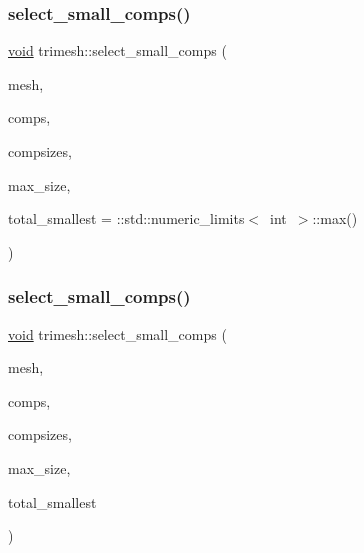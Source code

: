 \mbox{\label{namespacetrimesh_a2ce21b5b98ba2c6875d4c4506b344e91}} 
\subsubsection{\texorpdfstring{select\+\_\+small\+\_\+comps()}{select\_small\_comps()}\hspace{0.1cm}{\footnotesize\ttfamily [1/2]}}
{\footnotesize\ttfamily \hyperlink{namespacetrimesh_a784ddfd979e1c579bda795a8edfc3f43}{void} trimesh\+::select\+\_\+small\+\_\+comps (\begin{DoxyParamCaption}\item[{\hyperlink{classtrimesh_1_1TriMesh}{Tri\+Mesh} $\ast$}]{mesh,  }\item[{const \+::std\+::vector$<$ int $>$ \&}]{comps,  }\item[{const \+::std\+::vector$<$ int $>$ \&}]{compsizes,  }\item[{int}]{max\+\_\+size,  }\item[{int}]{total\+\_\+smallest = {\ttfamily \+:\+:std\+:\+:numeric\+\_\+limits$<$~int~$>$\+:\+:max()} }\end{DoxyParamCaption})}

\mbox{\label{namespacetrimesh_a62e760562ced336ba88b144230b7c14d}} 
\subsubsection{\texorpdfstring{select\+\_\+small\+\_\+comps()}{select\_small\_comps()}\hspace{0.1cm}{\footnotesize\ttfamily [2/2]}}
{\footnotesize\ttfamily \hyperlink{namespacetrimesh_a784ddfd979e1c579bda795a8edfc3f43}{void} trimesh\+::select\+\_\+small\+\_\+comps (\begin{DoxyParamCaption}\item[{\hyperlink{classtrimesh_1_1TriMesh}{Tri\+Mesh} $\ast$}]{mesh,  }\item[{const vector$<$ int $>$ \&}]{comps,  }\item[{const vector$<$ int $>$ \&}]{compsizes,  }\item[{int}]{max\+\_\+size,  }\item[{int}]{total\+\_\+smallest }\end{DoxyParamCaption})}

